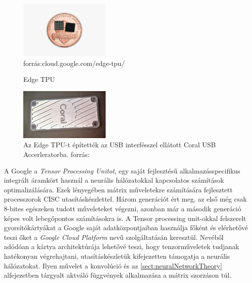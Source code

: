 \begin{figure}[h]
	\centering
	\includegraphics[width=0.4\textwidth]{fig/penny-edge-tpu}\\
	\footnotesize forrás:cloud.google.com/edge-tpu/
	\caption{Edge TPU}
	\label{fig:EdgeTPU}
\end{figure}
\begin{figure}[h]
	\centering
	\includegraphics[width=0.4\textwidth]{fig/Coral_USBAccelerator}\quad
	\caption[Coral USB Accelerator]{Az Edge TPU-t építették az USB interfésszel ellátott Coral USB Accerleratorba. \footnotesize forrás:\cite{web:GoogleEdge}}
	\label{fig:coralusbaccelerator}
\end{figure}

A Google a \emph{Tensor Processing Unitot}, egy saját fejlesztésű alkalmazásspecifikus integrált áramkört használ a neurális hálózatokkal kapcsolatos számítások optimalizálására. Ezek lényegében mátrix műveletekre számítására fejlesztett processzorok CISC utasításkészlettel. Három generációt ért meg, az első még csak 8-bites egészeken tudott műveleteket végezni, azonban már a második generáció képes volt lebegőpontos számításokra is. A Tensor processing unit-okkal felszerelt gyorsítókártyákat a Google saját adatközpontjaiban használja főként és elérhetővé teszi őket a \emph{Google Cloud Platform} nevű szolgáltatásán keresztül. Nevéből adódóan a kártya architektúrája lehetővé teszi, hogy  tenzorműveletek tudjanak hatékonyan végrehajtani, utasításkészletük kifejezetten támogatja a neurális hálózatokat. Ilyen művelet a konvolúció és az \ref{sect:neuralNetworkTheory} alfejezetben tárgyalt aktváló függvények alkalmazása a mátrix szorzáson túl.


